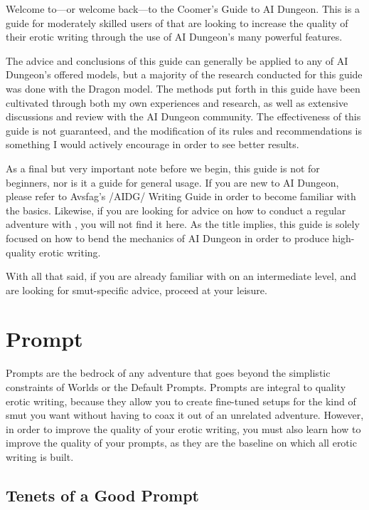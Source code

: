 ﻿\documentclass[Coomer-main.tex]{subfiles}
\begin{document}
\label{ch:preface}

Welcome to—or welcome back—to the Coomer's Guide to AI Dungeon. This is a guide for moderately skilled users of \aid that are looking to increase the quality of their erotic writing through the use of AI Dungeon's many powerful features.

The advice and conclusions of this guide can generally be applied to any of AI Dungeon's offered models, but a majority of the research conducted for this guide was done with the Dragon model. The methods put forth in this guide have been cultivated through both my own experiences and research, as well as extensive discussions and review with the AI Dungeon community. The effectiveness of this guide is not guaranteed, and the modification of its rules and recommendations is something I would actively encourage in order to see better results.

As a final but very important note before we begin, this guide is not for beginners, nor is it a guide for general usage. If you are new to AI Dungeon, please refer to Avsfag's /AIDG/ Writing Guide in order to become familiar with the basics. Likewise, if you are looking for advice on how to conduct a regular adventure with \aid, you will not find it here. As the title implies, this guide is solely focused on how to bend the mechanics of AI Dungeon in order to produce high-quality erotic writing.

With all that said, if you are already familiar with \aid on an intermediate level, and are looking for smut-specific advice, proceed at your leisure.

\chapter{Prompt}
\label{ch:prompts}

Prompts are the bedrock of any \aid adventure that goes beyond the simplistic constraints of Worlds or the Default Prompts. Prompts are integral to quality erotic writing, because they allow you to create fine-tuned setups for the kind of smut you want without having to coax it out of an unrelated adventure. However, in order to improve the quality of your erotic writing, you must also learn how to improve the quality of your prompts, as they are the baseline on which all erotic writing is built.

\section{Tenets of a Good Prompt}
\label{sec:tenets}
\end{document}
